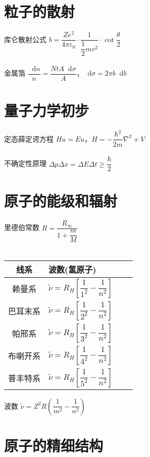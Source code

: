 \documentclass{article}
\newcommand*{\md}{\mathop{}\!\mathrm{d}}
\begin{document}
\begin{multicols}{2}

\section{粒子的散射}

库仑散射公式 $b = \dfrac{Z e^2}{4 \pi \varepsilon_0} \cdot \dfrac{1}{\dfrac{1}{2} mv^2 } \cdot \cot \dfrac{\theta}{2}   $
\\\\
金属箔 $\dfrac{\md n}{n} = \dfrac{N t A \md \sigma}{A}  $，$\md \sigma = 2 \pi b \md b$
  
\section{量子力学初步}

定态薛定谔方程 $Hu=Eu$，$H = - \dfrac{\hbar^2}{2m} \nabla^2 + V $
\\\\
不确定性原理 $\Delta p \Delta x = \Delta E \Delta t \geq \dfrac{\hbar}{2} $

\section{原子的能级和辐射}

里德伯常数 $R = \dfrac{R_{\infty}}{1 + \dfrac{m}{M} } $
\\\\
\begin{tabular}[H]{@{}|Sl|Sl|}
  \hline
  线系 & 波数(氢原子) \\
  \hline
  赖曼系 & $\tilde{\nu} = R_H \left[ \dfrac{1}{1^2} - \dfrac{1}{n^2}   \right]$ \\
  \hline
  巴耳末系 & $\tilde{\nu} = R_H \left[ \dfrac{1}{2^2} - \dfrac{1}{n^2}   \right]$ \\
  \hline
  帕邢系 & $\tilde{\nu} = R_H \left[ \dfrac{1}{3^2} - \dfrac{1}{n^2}   \right]$ \\
  \hline
  布喇开系 & $\tilde{\nu} = R_H \left[ \dfrac{1}{4^2} - \dfrac{1}{n^2}   \right]$ \\
  \hline
  普丰特系 & $\tilde{\nu} = R_H \left[ \dfrac{1}{5^2} - \dfrac{1}{n^2}   \right]$ \\
  \hline
\end{tabular}

波数 $\tilde{\nu} = Z^2 R \left( \dfrac{1}{m^2} - \dfrac{1}{n^2}   \right)$

\section{原子的精细结构}


\end{multicols}
\end{document}
